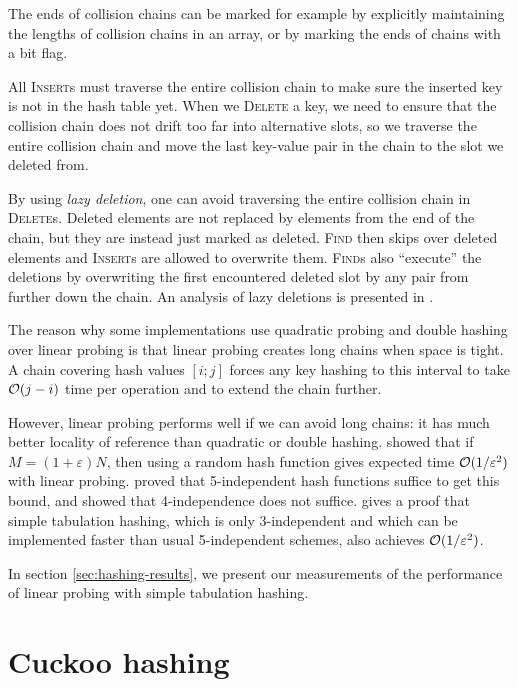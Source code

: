 The ends of collision chains can be marked for example by explicitly maintaining
the lengths of collision chains in an array, or by marking the ends of chains
with a bit flag.

All \textsc{Insert}s must traverse the entire collision chain to make sure
the inserted key is not in the hash table yet.
When we \textsc{Delete} a key, we need to ensure that the collision chain
does not drift too far into alternative slots, so we traverse the entire
collision chain and move the last key-value pair in the chain to the slot
we deleted from.

By using \emph{lazy deletion}, one can avoid traversing the entire collision
chain in \textsc{Delete}s. Deleted elements are not replaced by elements from
the end of the chain, but they are instead just marked as deleted.
\textsc{Find} then skips over deleted elements and \textsc{Insert}s are allowed
to overwrite them.  \textsc{Find}s also ``execute'' the deletions by
overwriting the first encountered deleted slot by any pair from further down
the chain. An analysis of lazy deletions is presented in \cite{lazy-deletions}.

The reason why some implementations use quadratic probing and double hashing
over linear probing is that linear probing creates long chains when space is
tight. A chain covering hash values $[i;j]$ forces any key hashing to this
interval to take $\mathcal{O}(j-i)$ time per operation and to extend the chain further.

However, linear probing performs well if we can avoid long chains: it has
much better locality of reference than quadratic or double hashing.
\cite{knuth-linear} showed that if $M=(1+\varepsilon) N$, then using a random
hash function gives expected time $\mathcal{O}(1/\varepsilon^2)$ with linear probing.
\cite{linear-probing-ci} proved that 5-independent hash functions suffice
to get this bound, and \cite{linear-probing-constant} showed that
4-independence does not suffice.
\cite{power-of-simple-tab} gives a proof that simple tabulation hashing,
which is only 3-independent and which can be implemented faster than usual
5-independent schemes, also achieves $\mathcal{O}(1/\varepsilon^2)$.

In section \ref{sec:hashing-results}, we present our measurements of the
performance of linear probing with simple tabulation hashing.

\section{Cuckoo hashing}
\label{sec:cuckoo}

